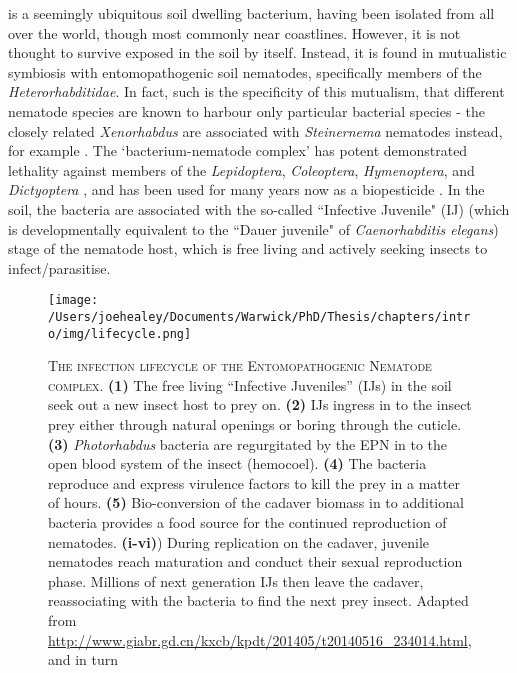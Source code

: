 \Pa{} is a seemingly ubiquitous soil dwelling bacterium, having been isolated from all over the world, though most commonly near coastlines. However, it is not thought to survive exposed in the soil by itself. Instead, it is found in mutualistic symbiosis with entomopathogenic soil nematodes, specifically members of the \emph{Heterorhabditidae}. In fact, such is the specificity of this mutualism, that different nematode species are known to harbour only particular bacterial species - the closely related \emph{Xenorhabdus} are associated with \emph{Steinernema} nematodes instead, for example \citep{Chaston2011}. The `bacterium-nematode complex' has potent demonstrated lethality against members of the \emph{Lepidoptera}, \emph{Coleoptera}, \emph{Hymenoptera}, and \emph{Dictyoptera} \citep{Naidoo2015}, and has been used for many years now as a biopesticide \citep{Waterfield2009}. In the soil, the bacteria are associated with the so-called ``Infective Juvenile" (IJ) (which is developmentally equivalent to the ``Dauer juvenile" of \emph{Caenorhabditis elegans}) stage of the nematode host, which is free living and actively seeking insects to infect/parasitise. 

\begin{figure}[h]
    \texttt{[image: /Users/joehealey/Documents/Warwick/PhD/Thesis/chapters/intro/img/lifecycle.png]}
    \captionsetup{singlelinecheck=off, justification=justified, font=footnotesize, aboveskip=10pt}
    \caption[Diagram of \emph{Photorhabdus} and \emph{Heterorhabditid} nematode infection cycle]{\textsc{\normalsize The infection lifecycle of the Entomopathogenic Nematode complex.}\vspace{0.1cm}\newline
\textbf{(1)} The free living ``Infective Juveniles'' (IJs) in the soil seek out a new insect host to prey on. \textbf{(2)} IJs ingress in to the insect prey either through natural openings or boring through the cuticle. \textbf{(3)} \emph{Photorhabdus} bacteria are regurgitated by the EPN in to the open blood system of the insect (hemocoel). \textbf{(4)} The bacteria reproduce and express virulence factors to kill the prey in a matter of hours. \textbf{(5)} Bio-conversion of the cadaver biomass in to additional bacteria provides a food source for the continued reproduction of nematodes. \textbf{(i-vi)}) During replication on the cadaver, juvenile nematodes reach maturation and conduct their sexual reproduction phase. Millions of next generation IJs then leave the cadaver, reassociating with the bacteria to find the next prey insect. Adapted from \url{http://www.giabr.gd.cn/kxcb/kpdt/201405/t20140516_234014.html}, and in turn \citep{Ffrench-Constant2003}}
    
 \label{lifecyclefig}
\end{figure}


